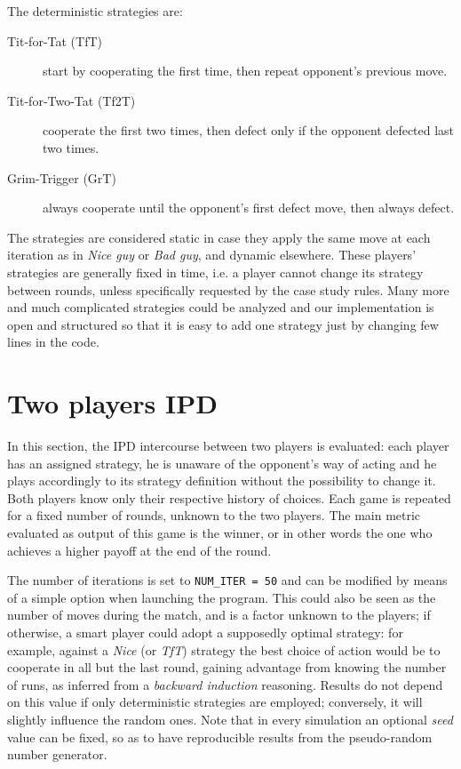 \documentclass[journal,10pt,twoside]{IEEEtran}
\begin{document}
The deterministic strategies are:
\begin{description}
    \item[Tit-for-Tat (TfT)] start by cooperating the first time, then repeat opponent's previous move.
    \item[Tit-for-Two-Tat (Tf2T)] cooperate the first two times, then defect only if the opponent defected last two times.
    \item[Grim-Trigger (GrT)] always cooperate until the opponent's first defect move, then always defect. 
\end{description}

The strategies are considered static in case they apply the same move at each iteration as in \textit{Nice guy} or \textit{Bad guy}, and dynamic elsewhere.
These players' strategies are generally fixed in time, i.e. a player cannot change its strategy between rounds, unless specifically requested by the case study rules.
Many more and much complicated strategies could be analyzed and our implementation is open and structured so that it is easy to add one strategy just by changing few lines in the code.
\section{Two players IPD} \label{s:IPD2P}
In this section, the IPD intercourse between two players is evaluated: each player has an assigned strategy, he is unaware of the opponent's way of acting and he plays accordingly to its strategy definition without the possibility to change it. Both players know only their respective history of choices. Each game is repeated for a fixed number of rounds, unknown to the two players. The main metric evaluated as output of this game is the winner, or in other words the one who achieves a higher payoff at the end of the round.

The number of iterations is set to \texttt{NUM\_ITER = 50} and can be modified by means of a simple option when launching the program.
This could also be seen as the number of moves during the match, and is a factor unknown to the players; if otherwise, a smart player could adopt a supposedly optimal strategy: for example, against a \textit{Nice} (or \textit{TfT}) strategy the best choice of action would be to cooperate in all but the last round, gaining advantage from knowing the number of runs, as inferred from a \textit{backward induction} reasoning.
Results do not depend on this value if only deterministic strategies are employed; conversely, it will slightly influence the random ones.
Note that in every simulation an optional \textit{seed} value can be fixed, so as to have reproducible results from the pseudo-random number generator.
\end{document}
